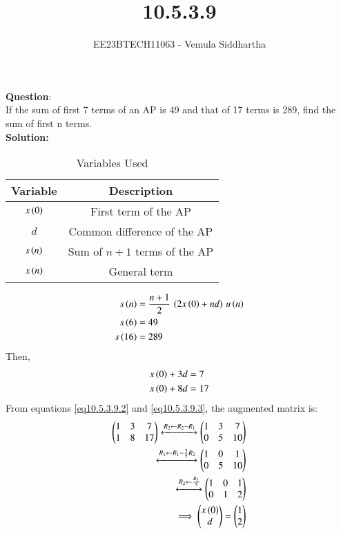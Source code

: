 \documentclass[journal,12pt,twocolumn]{IEEEtran}
\theoremstyle{remark}
\begin{document}

\vspace{3cm}

\title{10.5.3.9}
\author{EE23BTECH11063 - Vemula Siddhartha
}
\maketitle
\newpage
\bigskip

\renewcommand{\thefigure}{\theenumi}
\renewcommand{\thetable}{\theenumi}
\textbf{Question}:\\
If the sum of first 7 terms of an AP is 49 and that of 17 terms is 289, find the sum of
first n terms.
\\
\textbf{Solution: }
\begin{table}[h!]    
  \centering
  \begin{tabular}[12pt]{ |c| c|}
  \hline
  \textbf{Variable} & \textbf{Description}\\ 
  \hline
  $x\left(0\right)$ & First term of the AP \\
  \hline 
  $d$ & Common difference of the AP\\
  \hline
  $s\left(n\right)$ & Sum of $n+1$ terms of the AP\\
  \hline
  $x\left(n\right)$ & General term\\
  \hline   
  \end{tabular}
  \caption{Variables Used}
  \label{tab10.5.3.9.1}
\end{table}
\begin{align}
s\left(n\right)&=\frac{n+1}{2}\,\left(2x\left(0\right)+nd\right)\,u\left(n\right)\label{eq10.5.3.9.1}\\
s\left(6\right)&=49\\
s\left(16\right)&=289
\end{align}
Then,
\begin{align}
x\left(0\right)+3d&=7\label{eq10.5.3.9.2}\\
x\left(0\right)+8d&=17 \label{eq10.5.3.9.3}
\end{align}
From  equations \ref{eq10.5.3.9.2} and \ref{eq10.5.3.9.3}, the augmented matrix is:
\begin{align}
 \begin{pmatrix}
   1 & 3 & 7
   \\
   1 & 8 & 17
 \end{pmatrix}
 \xleftrightarrow[]{R_2 \leftarrow {R_2-R_1}}
 \begin{pmatrix}
   1 & 3 & 7
   \\
   0 & 5 & 10
 \end{pmatrix}
 \\
 \xleftrightarrow[]{R_1 \leftarrow {R_1-\frac{3}{5}R_2}}
 \begin{pmatrix}
   1 & 0 & 1
   \\
   0 & 5 & 10
 \end{pmatrix}
 \\
 \xleftrightarrow[]{R_2 \leftarrow \frac{R_2}{5}}
 \begin{pmatrix}
   1 & 0 & 1
   \\
   0 & 1 & 2
 \end{pmatrix}
 \\
 \implies \begin{pmatrix}
   x\left(0\right)
   \\
   d
 \end{pmatrix}
 =
 \begin{pmatrix}
   1
   \\
   2
 \end{pmatrix}
\end{align}
\end{document}

